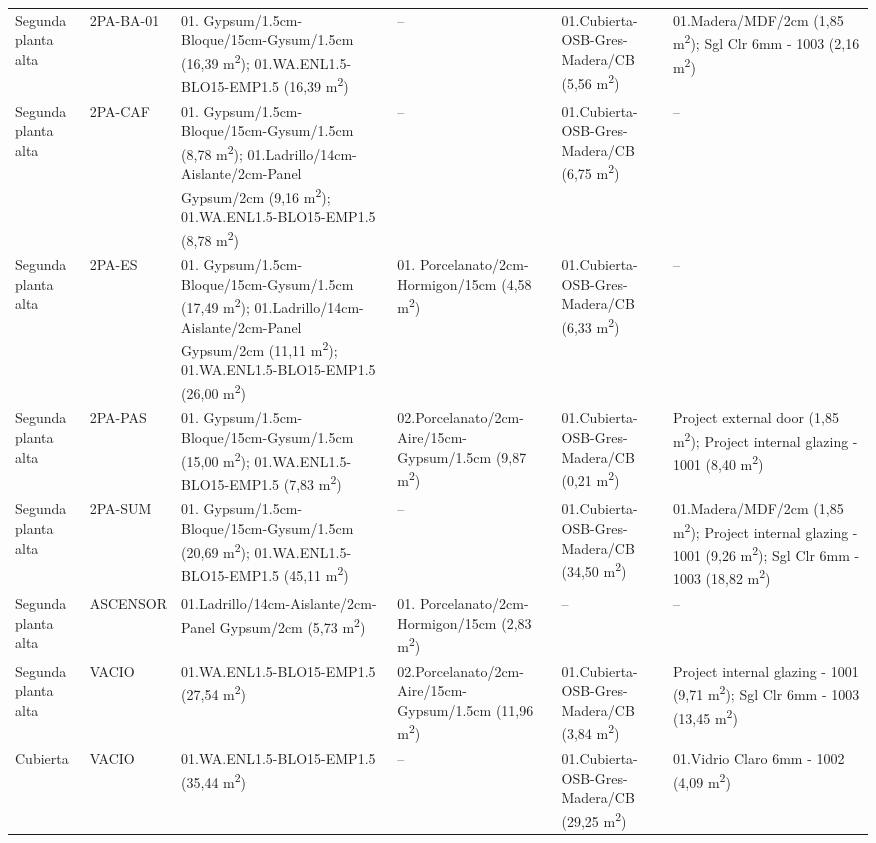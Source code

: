 {\begin{longtable}{p{2.1cm}p{1.6cm}p{3.3cm}p{3.1cm}p{2.5cm}p{2.7cm}}
  Segunda planta alta & 2PA-BA-01 & 01. Gypsum/1.5cm-Bloque/15cm-Gysum/1.5cm (16,39 m\textsuperscript{2}); 01.WA.ENL1.5-BLO15-EMP1.5 (16,39 m\textsuperscript{2}) & -- & 01.Cubierta-OSB-Gres-Madera/CB (5,56 m\textsuperscript{2}) & 01.Madera/MDF/2cm (1,85 m\textsuperscript{2}); Sgl Clr 6mm - 1003 (2,16 m\textsuperscript{2}) \\
  Segunda planta alta & 2PA-CAF & 01. Gypsum/1.5cm-Bloque/15cm-Gysum/1.5cm (8,78 m\textsuperscript{2}); 01.Ladrillo/14cm-Aislante/2cm-Panel Gypsum/2cm (9,16 m\textsuperscript{2}); 01.WA.ENL1.5-BLO15-EMP1.5 (8,78 m\textsuperscript{2}) & -- & 01.Cubierta-OSB-Gres-Madera/CB (6,75 m\textsuperscript{2}) & -- \\
  Segunda planta alta & 2PA-ES & 01. Gypsum/1.5cm-Bloque/15cm-Gysum/1.5cm (17,49 m\textsuperscript{2}); 01.Ladrillo/14cm-Aislante/2cm-Panel Gypsum/2cm (11,11 m\textsuperscript{2}); 01.WA.ENL1.5-BLO15-EMP1.5 (26,00 m\textsuperscript{2}) & 01. Porcelanato/2cm-Hormigon/15cm (4,58 m\textsuperscript{2}) & 01.Cubierta-OSB-Gres-Madera/CB (6,33 m\textsuperscript{2}) & -- \\
  Segunda planta alta & 2PA-PAS & 01. Gypsum/1.5cm-Bloque/15cm-Gysum/1.5cm (15,00 m\textsuperscript{2}); 01.WA.ENL1.5-BLO15-EMP1.5 (7,83 m\textsuperscript{2}) & 02.Porcelanato/2cm-Aire/15cm-Gypsum/1.5cm (9,87 m\textsuperscript{2}) & 01.Cubierta-OSB-Gres-Madera/CB (0,21 m\textsuperscript{2}) & Project external door (1,85 m\textsuperscript{2}); Project internal glazing - 1001 (8,40 m\textsuperscript{2}) \\
  Segunda planta alta & 2PA-SUM & 01. Gypsum/1.5cm-Bloque/15cm-Gysum/1.5cm (20,69 m\textsuperscript{2}); 01.WA.ENL1.5-BLO15-EMP1.5 (45,11 m\textsuperscript{2}) & -- & 01.Cubierta-OSB-Gres-Madera/CB (34,50 m\textsuperscript{2}) & 01.Madera/MDF/2cm (1,85 m\textsuperscript{2}); Project internal glazing - 1001 (9,26 m\textsuperscript{2}); Sgl Clr 6mm - 1003 (18,82 m\textsuperscript{2}) \\
  Segunda planta alta & ASCENSOR & 01.Ladrillo/14cm-Aislante/2cm-Panel Gypsum/2cm (5,73 m\textsuperscript{2}) & 01. Porcelanato/2cm-Hormigon/15cm (2,83 m\textsuperscript{2}) & -- & -- \\
  Segunda planta alta & VACIO & 01.WA.ENL1.5-BLO15-EMP1.5 (27,54 m\textsuperscript{2}) & 02.Porcelanato/2cm-Aire/15cm-Gypsum/1.5cm (11,96 m\textsuperscript{2}) & 01.Cubierta-OSB-Gres-Madera/CB (3,84 m\textsuperscript{2}) & Project internal glazing - 1001 (9,71 m\textsuperscript{2}); Sgl Clr 6mm - 1003 (13,45 m\textsuperscript{2}) \\
  Cubierta & VACIO & 01.WA.ENL1.5-BLO15-EMP1.5 (35,44 m\textsuperscript{2}) & -- & 01.Cubierta-OSB-Gres-Madera/CB (29,25 m\textsuperscript{2}) & 01.Vidrio Claro 6mm - 1002 (4,09 m\textsuperscript{2}) \\
\end{longtable}
}
